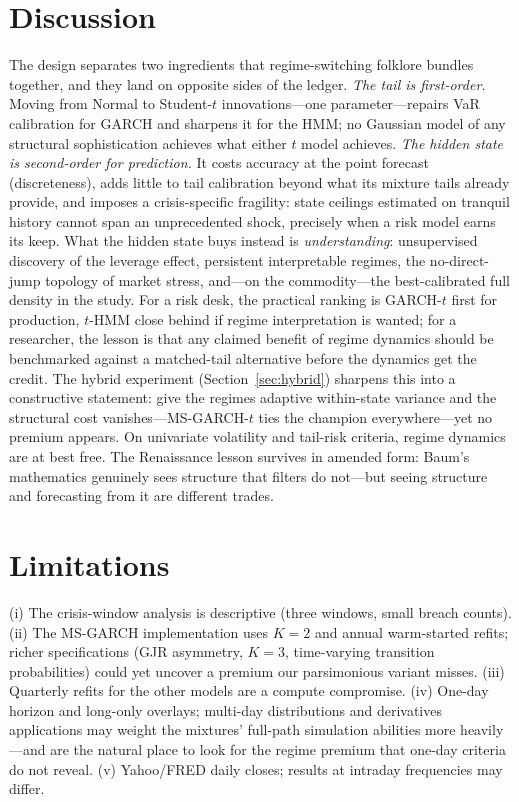 \documentclass[11pt]{article}
\begin{document}
\section{Discussion}
The design separates two ingredients that regime-switching folklore
bundles together, and they land on opposite sides of the ledger.
\emph{The tail is first-order.} Moving from Normal to Student-$t$
innovations---one parameter---repairs VaR calibration for GARCH and
sharpens it for the HMM; no Gaussian model of any structural
sophistication achieves what either $t$ model achieves. \emph{The hidden
state is second-order for prediction.} It costs accuracy at the point
forecast (discreteness), adds little to tail calibration beyond what its
mixture tails already provide, and imposes a crisis-specific fragility:
state ceilings estimated on tranquil history cannot span an unprecedented
shock, precisely when a risk model earns its keep. What the hidden state
buys instead is \emph{understanding}: unsupervised discovery of the
leverage effect, persistent interpretable regimes, the no-direct-jump
topology of market stress, and---on the commodity---the best-calibrated
full density in the study. For a risk desk, the practical ranking is
GARCH-$t$ first for production, $t$-HMM close behind if regime
interpretation is wanted; for a researcher, the lesson is that any claimed
benefit of regime dynamics should be benchmarked against a matched-tail
alternative before the dynamics get the credit. The hybrid experiment
(Section~\ref{sec:hybrid}) sharpens this into a constructive statement:
give the regimes adaptive within-state variance and the structural cost
vanishes---MS-GARCH-$t$ ties the champion everywhere---yet no premium
appears. On univariate volatility and tail-risk criteria, regime dynamics
are at best free. The Renaissance lesson survives in amended form: Baum's
mathematics genuinely sees structure that filters do not---but seeing
structure and forecasting from it are different trades.

\section{Limitations}
(i) The crisis-window analysis is descriptive (three windows, small breach
counts). (ii) The MS-GARCH implementation uses $K{=}2$ and annual
warm-started refits; richer specifications (GJR asymmetry, $K{=}3$,
time-varying transition probabilities) could yet uncover a premium our
parsimonious variant misses. (iii) Quarterly refits for the other models
are a compute compromise. (iv) One-day horizon and long-only overlays;
multi-day distributions and derivatives applications may weight the
mixtures' full-path simulation abilities more heavily---and are the
natural place to look for the regime premium that one-day criteria do not
reveal. (v) Yahoo/FRED daily closes; results at intraday frequencies may
differ.
\end{document}
